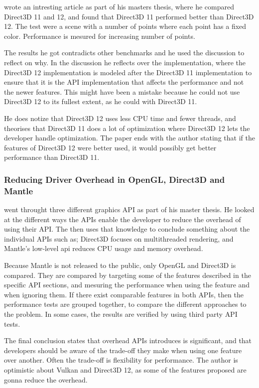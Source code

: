 \citet{2016_direct3d} wrote an intresting article as part of his masters thesis, where he compared Direct3D 11 and 12, and found that Direct3D 11 performed better than Direct3D 12.
The test were a scene with a number of points where each point has a fixed color.
Performance is mesured for increasing number of points.

The results he got contradicts other benchmarks and he used the discussion to reflect on why.
In the discussion he reflects over the implementation, where the Direct3D 12 implementation is modeled after the Direct3D 11 implementation to ensure that it is the \gls{API} implementation that affects the performance and not the newer features.
This might have been a mistake because he could not use Direct3D 12 to its fullest extent, as he could with Direct3D 11.

He does notize that Direct3D 12 uses less \gls{CPU} time and fewer threads, and theorises that Direct3D 11 does a lot of optimization where Direct3D 12 lets the developer handle optimization.
The paper ends with the author stating that if the features of Direct3D 12 were better used, it would possibly get better performance than Direct3D 11.

\subsubsection{Reducing Driver Overhead in OpenGL, Direct3D and Mantle}

\citet{dobersberger_2015_reducing} went throught three different graphics \gls{API} as part of his master thesis. 
He looked at the different ways the \glspl{API} enable the developer to reduce the overhead of using their \gls{API}.
The then uses that knowledge to conclude something about the individual \glspl{API} such as; Direct3D focuses on multithreaded rendering, and Mantle's low-level api reduces \gls{CPU} usage and memory overhead.

Because Mantle is not released to the public, only OpenGL and Direct3D is compared.
They are compared by targeting some of the features described in the specific \gls{API} sections, and mesuring the performance when using the feature and when ignoring them.
If there exist comparable features in both \glspl{API}, then the performance tests are grouped together, to compare the different approaches to the problem.
In some cases, the results are verified by using third party \gls{API} tests.

The final conclusion states that overhead \glspl{API} introduces is significant, and that developers should be aware of the trade-off they make when using one feature over another.
Often the trade-off is flexibility for performance.
The author is optimistic about Vulkan and Direct3D 12, as some of the features proposed are gonna reduce the overhead.

